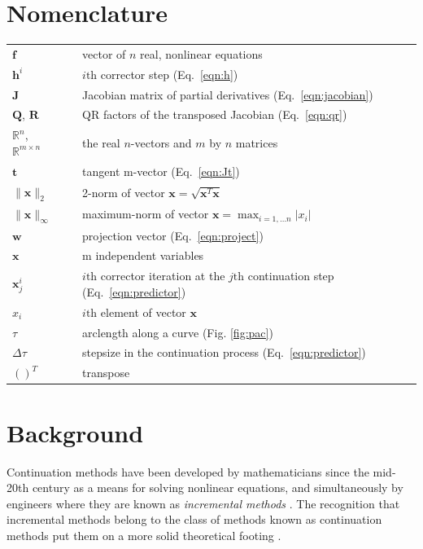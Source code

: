\documentclass[10pt,openany,twoside]{book}
\numberwithin{equation}{section}   %
\newcommand{\Matrix}[1]{\boldsymbol{#1}}
\newcommand{\Vector}[1]{\boldsymbol{#1}}
\newcommand{\Eqn}[1]{Eq.\ \ref{#1}}
\newcommand{\Figref}[1]{Fig. \ref{#1}}
\newcommand{\Step}{\Delta\tau} %
\begin{document}
\section{Nomenclature}\label{sect:pac-nomenclature}
\begin{small}
\noindent\begin{longtable}{@{}lcl@{}}
$\Vector{f}$ & & vector of $n$ real, nonlinear equations \\
$\Vector{h}^i$ & & $i\text{th}$ corrector step (\Eqn{eqn:h}) \\
$\Matrix{J}$ & & Jacobian matrix of partial derivatives (\Eqn{eqn:jacobian}) \\
$\Matrix{Q}$, $\Matrix{R}$ & & QR factors of the transposed Jacobian (\Eqn{eqn:qr}) \\
$\mathbb{R}^n$, $\mathbb{R}^{m \times n}$ & & the real $n$-vectors and $m$ by $n$ matrices \\
$\Vector{t}$ & & tangent m-vector (\Eqn{eqn:Jt}) \\
$\|\Vector{x}\|_2$ & & 2-norm of vector $\Vector{x} =
   \sqrt{\Vector{x}^T\Vector{x}}$ \index{2-norm!real}\\
$\|\Vector{x}\|_\infty$ & & maximum-norm of vector $\Vector{x} = {\displaystyle \max_{i=1,\ldots n} |x_i|}$ \\
$\Vector{w}$ & & projection vector (\Eqn{eqn:project}) \\
$\Vector{x}$ & & m independent variables \\
$\Vector{x}_j^i$ & & $i\text{th}$ corrector iteration at the $j\text{th}$
   continuation step (\Eqn{eqn:predictor}) \\
$x_i$ & & $i\text{th}$ element of vector $\Vector{x}$ \\
$\tau$ & & arclength along a curve (\Figref{fig:pac}) \\
$\Step$ & & stepsize in the continuation process (\Eqn{eqn:predictor}) \\
$()^T$ & & transpose \\
\end{longtable}
\end{small}

\section{Background}\label{sect:background}
Continuation methods have been developed by mathematicians since the
mid-20th century as a means for solving nonlinear equations,
and simultaneously by engineers where they are known as
\emph{incremental methods} \cite{oden2006finite}.
The recognition that incremental methods belong to the class of methods
known as continuation methods put them on a more solid theoretical footing
\cite{rheinboldt1981numerical}.
\end{document}
